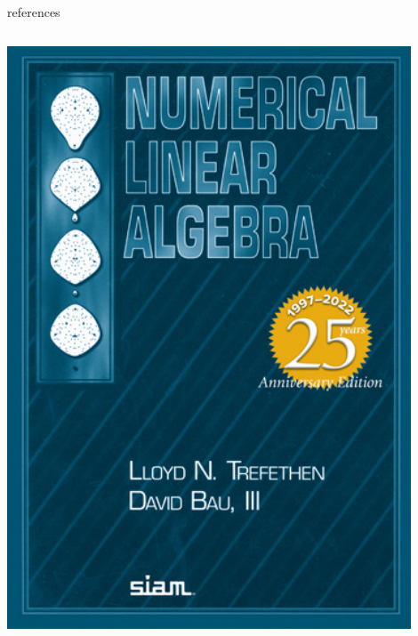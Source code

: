 \documentclass[10pt,
               svgnames,
               hyperref={colorlinks,citecolor=DeepPink4,linkcolor=FireBrick,urlcolor=Maroon},
               usepdftitle=false]{beamer}
\begin{document}
\begin{frame}{references}
\begin{columns}
\begin{column}{0.17\textwidth}
\medskip
\hfill \includegraphics[width=0.9\textwidth]{images/trefethenbau.jpg}
\end{column}
\end{columns}
\end{frame}
\end{document}
